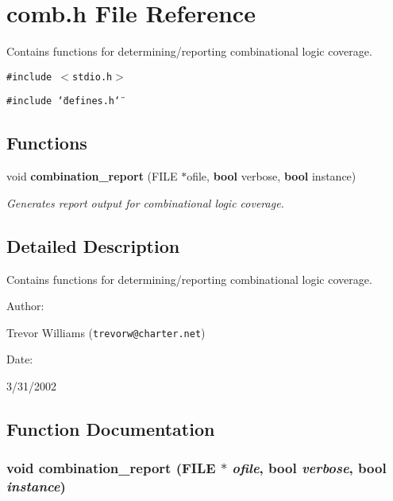 \section{comb.h File Reference}
\label{comb_8h}
Contains functions for determining/reporting combinational logic coverage. 


{\tt \#include $<$stdio.h$>$}\par
{\tt \#include \char`\"{}defines.h\char`\"{}}\par
\subsection*{Functions}
\begin{CompactItemize}
\item 
void {\bf combination\_\-report} (FILE $\ast$ofile, {\bf bool} verbose, {\bf bool} instance)
\begin{CompactList}\small\item\em Generates report output for combinational logic coverage.\item\end{CompactList}\end{CompactItemize}


\subsection{Detailed Description}
Contains functions for determining/reporting combinational logic coverage.



\begin{Desc}
\item[Author: ]\par
Trevor Williams ({\tt trevorw@charter.net}) \end{Desc}
\begin{Desc}
\item[Date: ]\par
3/31/2002\end{Desc}


\subsection{Function Documentation}
\subsubsection{\setlength{\rightskip}{0pt plus 5cm}void combination\_\-report (FILE $\ast$ {\em ofile}, {\bf bool} {\em verbose}, {\bf bool} {\em instance})}\label{comb_8h_a0}


